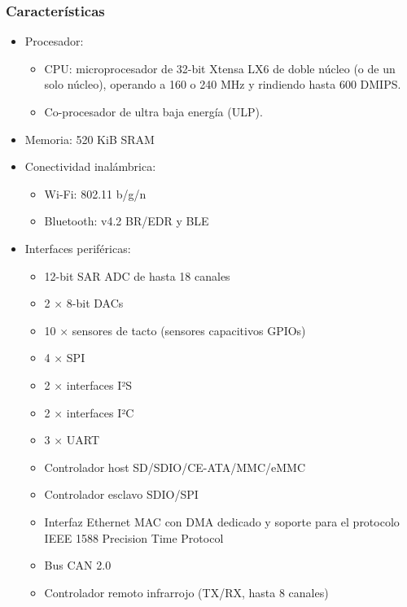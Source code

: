     \subsubsection{Características}
        \begin{itemize}
            \item Procesador:
                \begin{itemize}
                    \item CPU: microprocesador de 32-bit Xtensa LX6 de doble núcleo (o de un solo núcleo), operando a 160 o 240 MHz y rindiendo hasta 600 DMIPS.
                    \item Co-procesador de ultra baja energía (ULP).
                \end{itemize}
            \item Memoria: 520 KiB SRAM
            \item Conectividad inalámbrica:
                \begin{itemize}
                    \item Wi-Fi: 802.11 b/g/n
                    \item Bluetooth: v4.2 BR/EDR y BLE
                \end{itemize}
            \item Interfaces periféricas:
                \begin{itemize}
                    \item 12-bit SAR ADC de hasta 18 canales
                    \item 2 × 8-bit DACs
                    \item 10 × sensores de tacto (sensores capacitivos GPIOs)
                    \item 4 × SPI
                    \item 2 × interfaces I²S
                    \item 2 × interfaces I²C
                    \item 3 × UART
                    \item Controlador host SD/SDIO/CE-ATA/MMC/eMMC
                    \item Controlador esclavo SDIO/SPI
                    \item Interfaz Ethernet MAC con DMA dedicado y soporte para el protocolo IEEE 1588 Precision Time Protocol
                    \item Bus CAN 2.0
                    \item Controlador remoto infrarrojo (TX/RX, hasta 8 canales)

\end{itemize}
\end{itemize}
